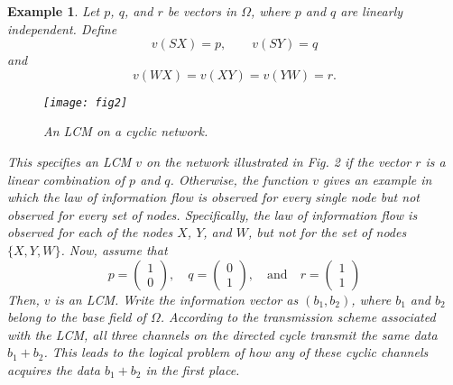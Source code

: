 \documentclass[journal]{IEEEtran}
\newtheorem{exam}[prop]{Example}
\begin{document}
\begin{exam}
	Let $p$, $q$, and $r$ be vectors in $\Omega$, where $p$ and $q$ are linearly independent. Define
	$$
	v(SX)=p,\qquad v(SY)=q
	$$
	and
	$$
	v(WX)=v(XY)=v(YW)=r.
	$$
	\begin{figure}[H]
		\centering
		\texttt{[image: fig2]}
		\caption{An LCM on a cyclic network.}
		\label{fig2}
	\end{figure}
	This specifies an LCM $v$ on the network illustrated in Fig. 2 if the vector $r$ is a linear combination of $p$ and $q$. Otherwise,	the function $v$ gives an example in which the law of information flow is observed for every single node but not observed for every set of nodes. Specifically, the law of information flow is observed for each of the nodes $X$, $Y$, and $W$, but not for the set of nodes $\{X,Y,W\}$.
	Now, assume that
	$$
	p=\begin{pmatrix} 1 \\ 0 \end{pmatrix},\quad q=\begin{pmatrix} 0 \\ 1 \end{pmatrix},\quad \text{and}\quad r=\begin{pmatrix} 1 \\ 1 \end{pmatrix}
	$$
	Then, $v$ is an LCM. Write the information vector as $(b_1,b_2)$, where $b_1$ and $b_2$ belong to the base field of $\Omega$. According to the transmission scheme associated with the LCM, all three channels on the directed cycle transmit the same data $b_1+b_2$. This leads to the logical problem of how any of these cyclic channels	acquires the data $b_1+b_2$ in the first place.
\end{exam}
\end{document}
